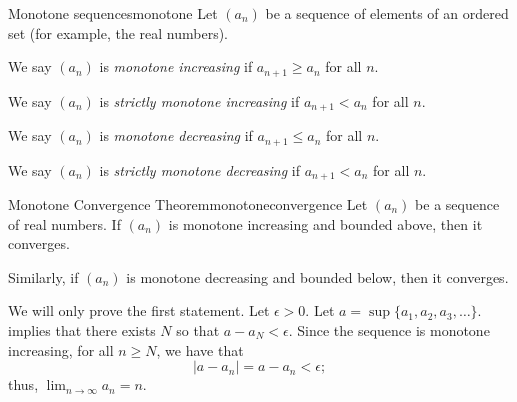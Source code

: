 
\begin{defn}{Monotone sequences}{monotone}
	Let \((a_n)\) be a sequence of elements of an ordered set (for example, the real numbers).

	We say \((a_n)\) is \emph{monotone increasing} if \(a_{n+1} \geq a_n\) for all $n$.

	We say \((a_n)\) is \emph{strictly monotone increasing} if \(a_{n+1} < a_n\) for all $n$.

	We say \((a_n)\) is \emph{monotone decreasing} if \(a_{n+1} \leq a_n\) for all $n$.

	We say \((a_n)\) is \emph{strictly monotone decreasing} if \(a_{n+1} < a_n\) for all $n$.
\end{defn}

\begin{thm}{Monotone Convergence Theorem}{monotoneconvergence}
	Let \((a_n)\) be a sequence of real numbers.
	If \((a_n)\) is monotone increasing and bounded above, then it converges.
	
	Similarly, if \((a_n)\) is monotone decreasing and bounded below, then it converges.
\end{thm}

\begin{dem}{}{}
	We will only prove the first statement. Let \(\epsilon > 0\). Let \(a = \sup\{a_1, a_2, a_3, \dots\}\).  implies that there exists \(N\) so that \(a - a_N < \epsilon\). Since the sequence is monotone increasing, for all \(n \geq N\), we have that  \[
		|a - a_n| = a - a_n < \epsilon;
	\]
	thus, \(\lim_{n\to\infty} a_n = n\).
\end{dem}

